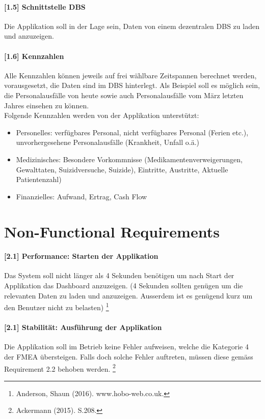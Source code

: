\documentclass[a4paper]{scrreprt}
\begin{document}
\paragraph{[1.5] Schnittstelle DBS}
Die Applikation soll in der Lage sein, Daten von einem dezentralen DBS zu laden und anzuzeigen. 

\paragraph{[1.6] Kennzahlen}
Alle Kennzahlen können jeweils auf frei wählbare Zeitspannen berechnet werden, vorausgesetzt, die Daten sind im DBS hinterlegt. Als Beispiel soll es möglich sein, die Personalausfälle von heute sowie auch Personalausfälle vom März letzten Jahres einsehen zu können. \\
Folgende Kennzahlen werden von der Applikation unterstützt:
\begin{itemize}
\item Personelles: verfügbares Personal, nicht verfügbares Personal (Ferien etc.), unvorhergesehene Personalausfälle (Krankheit, Unfall o.ä.)
\item Medizinisches: Besondere Vorkommnisse (Medikamentenverweigerungen, Gewalttaten, Suizidversuche, Suizide), Eintritte, Austritte, Aktuelle Patientenzahl)
\item Finanzielles: Aufwand, Ertrag, Cash Flow
\end{itemize}

\section{Non-Functional Requirements}
\paragraph{[2.1] Performance: Starten der Applikation}
Das System soll nicht länger als 4 Sekunden benötigen um nach Start der Applikation das Dashboard anzuzeigen. (4 Sekunden sollten genügen um die relevanten Daten zu laden und anzuzeigen. Ausserdem ist es genügend kurz um den Benutzer nicht zu belasten)
\footnote{Anderson, Shaun (2016). www.hobo-web.co.uk.}

\paragraph{[2.1] Stabilität: Ausführung der Applikation}
Die Applikation soll im Betrieb keine Fehler aufweisen, welche die Kategorie 4 der FMEA übersteigen. Falls doch solche Fehler auftreten, müssen diese gemäss Requirement 2.2 behoben werden. 
\footnote{Ackermann (2015). S.208.}
\end{document}
